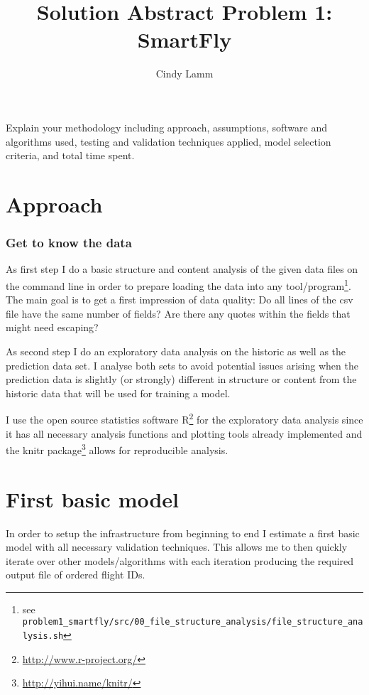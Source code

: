 \documentclass[12pt,a4paper]{article}
\author{Cindy Lamm}
\title{Solution Abstract Problem 1: SmartFly}
\begin{document}
\VerbatimFootnotes
\maketitle

Explain your methodology including approach, assumptions, software and algorithms used, testing and validation techniques applied, model selection criteria, and total time spent.

\section{Approach} %
\label{approach}

\subsubsection{Get to know the data} %
\label{sub:get2know_data}

As first step I do a basic structure and content analysis of the given data files on the command line in order to prepare loading the data into any tool/program\footnote{see \verb+problem1_smartfly/src/00_file_structure_analysis/file_structure_analysis.sh+ }. The main goal is to get a first impression of data quality: Do all lines of the csv file have the same number of fields? Are there any quotes within the fields that might need escaping?

As second step I do an exploratory data analysis on the historic as well as the prediction data set. I analyse both sets to avoid potential issues arising when the prediction data is slightly (or strongly) different in structure or content from the historic data that will be used for training a model. 

I use the open source statistics software R\footnote{\url{http://www.r-project.org/}} for the exploratory data analysis since it has all necessary analysis functions and plotting tools already implemented and the knitr package\footnote{\url{http://yihui.name/knitr/}} allows for reproducible analysis.


\section{First basic model} %
\label{first_basic_model}

In order to setup the infrastructure from beginning to end I estimate a first basic model with all necessary validation techniques. This allows me to then quickly iterate over other models/algorithms with each iteration producing the required output file of ordered flight IDs.
\end{document}
